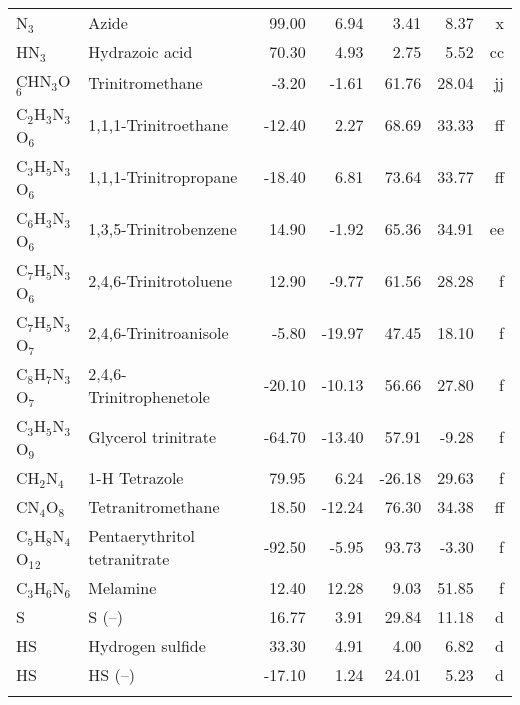 \begin{table}
\begin{center}
\begin{tabular}{llrrrrr}
 N$_3$          & Azide                           &    99.00    &     6.94  &     3.41  &     8.37  &      x\\
 HN$_3$         & Hydrazoic acid                  &    70.30    &     4.93  &     2.75  &     5.52  &     cc\\
 CHN$_3$O$_6$      & Trinitromethane                 &    -3.20    &    -1.61  &    61.76  &    28.04  &     jj\\
 C$_2$H$_3$N$_3$O$_6$    & 1,1,1-Trinitroethane            &   -12.40    &     2.27  &    68.69  &    33.33  &     ff\\
 C$_3$H$_5$N$_3$O$_6$    & 1,1,1-Trinitropropane           &   -18.40    &     6.81  &    73.64  &    33.77  &     ff\\
 C$_6$H$_3$N$_3$O$_6$    & 1,3,5-Trinitrobenzene           &    14.90    &    -1.92  &    65.36  &    34.91  &     ee\\
 C$_7$H$_5$N$_3$O$_6$    & 2,4,6-Trinitrotoluene           &    12.90    &    -9.77  &    61.56  &    28.28  &      f\\
 C$_7$H$_5$N$_3$O$_7$    & 2,4,6-Trinitroanisole           &    -5.80    &   -19.97  &    47.45  &    18.10  &      f\\
 C$_8$H$_7$N$_3$O$_7$    & 2,4,6-Trinitrophenetole         &   -20.10    &   -10.13  &    56.66  &    27.80  &      f\\
 C$_3$H$_5$N$_3$O$_9$    & Glycerol trinitrate             &   -64.70    &   -13.40  &    57.91  &    -9.28  &      f\\
 CH$_2$N$_4$       & 1-H Tetrazole                   &    79.95    &     6.24  &   -26.18  &    29.63  &      f\\
 CN$_4$O$_8$       & Tetranitromethane               &    18.50    &   -12.24  &    76.30  &    34.38  &     ff\\
 C$_5$H$_8$N$_4$O$_1$$_2$   & Pentaerythritol tetranitrate    &   -92.50    &    -5.95  &    93.73  &    -3.30  &      f\\
 C$_3$H$_6$N$_6$      & Melamine                        &    12.40    &    12.28  &     9.03  &    51.85  &      f\\
 S           & S (--)                           &    16.77    &     3.91  &    29.84  &    11.18  &      d\\
 HS          & Hydrogen sulfide                &    33.30    &     4.91  &     4.00  &     6.82  &      d\\
 HS          & HS (--)                          &   -17.10    &     1.24  &    24.01  &     5.23  &      d\\
$$
\end{tabular}
\end{center}
\end{table}
